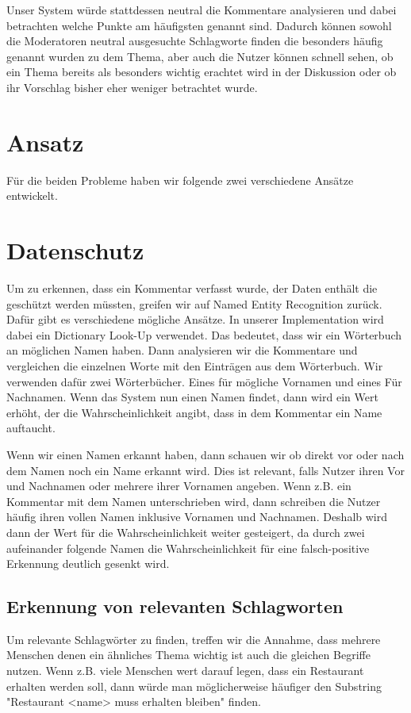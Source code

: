 \documentclass[runningheads]{llncs}
\begin{document}
Unser System würde stattdessen neutral die Kommentare analysieren und dabei betrachten welche Punkte am häufigsten genannt sind.
Dadurch können sowohl die Moderatoren neutral ausgesuchte Schlagworte finden die besonders häufig genannt wurden zu dem Thema, aber auch die Nutzer können schnell sehen, ob ein Thema bereits als besonders wichtig erachtet wird in der Diskussion oder ob ihr Vorschlag bisher eher weniger betrachtet wurde.

\section{Ansatz}
Für die beiden Probleme haben wir folgende zwei verschiedene Ansätze entwickelt.
\section{Datenschutz}
Um zu erkennen, dass ein Kommentar verfasst wurde, der Daten enthält die geschützt werden müssten, greifen wir auf Named Entity Recognition zurück.
Dafür gibt es verschiedene mögliche Ansätze.
In unserer Implementation wird dabei ein Dictionary Look-Up verwendet.
Das bedeutet, dass wir ein Wörterbuch an möglichen Namen haben.
Dann analysieren wir die Kommentare und vergleichen die einzelnen Worte mit den Einträgen aus dem Wörterbuch.
Wir verwenden dafür zwei Wörterbücher.
Eines für mögliche Vornamen und eines Für Nachnamen.
Wenn das System nun einen Namen findet, dann wird ein Wert erhöht, der die Wahrscheinlichkeit angibt, dass in dem Kommentar ein Name auftaucht.

Wenn wir einen Namen erkannt haben, dann schauen wir ob direkt vor oder nach dem Namen noch ein Name erkannt wird.
Dies ist relevant, falls Nutzer ihren Vor und Nachnamen oder mehrere ihrer Vornamen angeben. Wenn z.B. ein Kommentar mit dem Namen unterschrieben wird, dann schreiben die Nutzer häufig ihren vollen Namen inklusive Vornamen und Nachnamen.
Deshalb wird dann der Wert für die Wahrscheinlichkeit weiter gesteigert, da durch zwei aufeinander folgende Namen die Wahrscheinlichkeit für eine falsch-positive Erkennung deutlich gesenkt wird.
\subsection{Erkennung von relevanten Schlagworten}
Um relevante Schlagwörter zu finden, treffen wir die Annahme, dass mehrere Menschen denen ein ähnliches Thema wichtig ist auch die gleichen Begriffe nutzen.
Wenn z.B. viele Menschen wert darauf legen, dass ein Restaurant erhalten werden soll, dann würde man möglicherweise häufiger den Substring "Restaurant <name> muss erhalten bleiben" finden.
\end{document}
